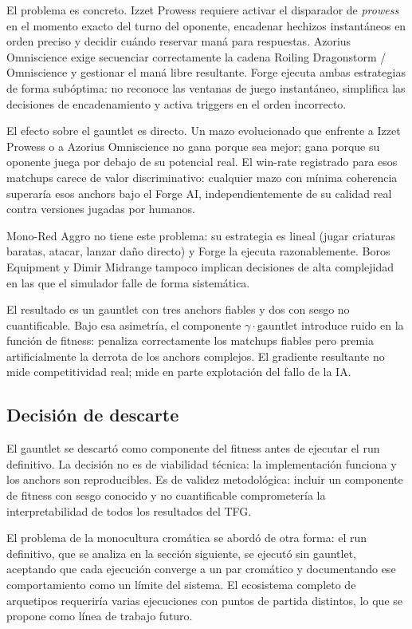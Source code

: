 El problema es concreto. Izzet Prowess requiere activar el disparador de \emph{prowess} en el momento exacto del turno del oponente, encadenar hechizos instantáneos en orden preciso y decidir cuándo reservar maná para respuestas. Azorius Omniscience exige secuenciar correctamente la cadena Roiling Dragonstorm / Omniscience y gestionar el maná libre resultante. Forge ejecuta ambas estrategias de forma subóptima: no reconoce las ventanas de juego instantáneo, simplifica las decisiones de encadenamiento y activa triggers en el orden incorrecto.

El efecto sobre el gauntlet es directo. Un mazo evolucionado que enfrente a Izzet Prowess o a Azorius Omniscience no gana porque sea mejor; gana porque su oponente juega por debajo de su potencial real. El win-rate registrado para esos matchups carece de valor discriminativo: cualquier mazo con mínima coherencia superaría esos anchors bajo el Forge AI, independientemente de su calidad real contra versiones jugadas por humanos.

Mono-Red Aggro no tiene este problema: su estrategia es lineal (jugar criaturas baratas, atacar, lanzar daño directo) y Forge la ejecuta razonablemente. Boros Equipment y Dimir Midrange tampoco implican decisiones de alta complejidad en las que el simulador falle de forma sistemática.

El resultado es un gauntlet con tres anchors fiables y dos con sesgo no cuantificable. Bajo esa asimetría, el componente $\gamma \cdot \text{gauntlet}$ introduce ruido en la función de fitness: penaliza correctamente los matchups fiables pero premia artificialmente la derrota de los anchors complejos. El gradiente resultante no mide competitividad real; mide en parte explotación del fallo de la IA.

\subsection{Decisión de descarte}

El gauntlet se descartó como componente del fitness antes de ejecutar el run definitivo. La decisión no es de viabilidad técnica: la implementación funciona y los anchors son reproducibles. Es de validez metodológica: incluir un componente de fitness con sesgo conocido y no cuantificable comprometería la interpretabilidad de todos los resultados del TFG.

El problema de la monocultura cromática se abordó de otra forma: el run definitivo, que se analiza en la sección siguiente, se ejecutó sin gauntlet, aceptando que cada ejecución converge a un par cromático y documentando ese comportamiento como un límite del sistema. El ecosistema completo de arquetipos requeriría varias ejecuciones con puntos de partida distintos, lo que se propone como línea de trabajo futuro.

